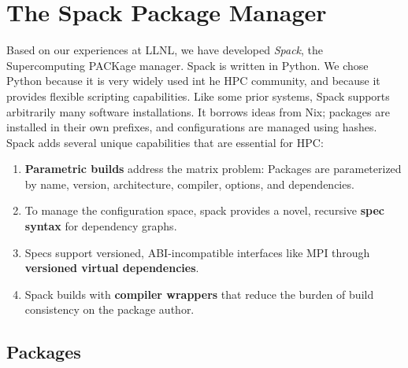 
\section{The Spack Package Manager}
\label{sec:implementation}
Based on our experiences at LLNL, we have developed
{\it Spack}, the Supercomputing PACKage manager.
Spack is written in Python.  We chose Python because it is
very widely used int he HPC community, and because it provides
flexible scripting capabilities. 
%
Like some prior systems, Spack supports arbitrarily many software installations.
It borrows ideas from Nix; packages are installed in their own prefixes,
and configurations are managed using hashes.
% 
Spack adds several unique capabilities that are essential for HPC:
\begin{enumerate}
\item {\bf Parametric builds} address the matrix problem:
      Packages are parameterized by name, version, architecture, compiler, 
      options, and dependencies.
\item To manage the configuration space, spack provides a novel, 
      recursive {\bf spec syntax} for dependency graphs.
\item Specs support versioned, ABI-incompatible interfaces like MPI through
      {\bf versioned virtual dependencies}.
\item Spack builds with {\bf compiler wrappers} that reduce the burden of build
      consistency on the package author.
\end{enumerate}

\subsection{Packages}

